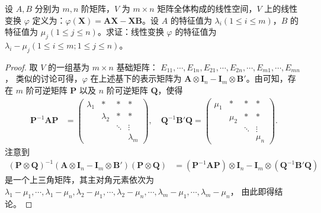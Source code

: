\documentclass[../../main.tex]{subfiles}%
\begin{document}
\begin{proposition}\label{proposition:线性变换AX-XB的表示矩阵和特征值}
设 $A,B$ 分别为 $m,n$ 阶矩阵，$V$ 为 $m \times n$ 矩阵全体构成的线性空间，$V$ 上的线性变换 $\varphi$ 定义为：$\varphi(\boldsymbol{X}) = \boldsymbol{AX} - \boldsymbol{XB}$。设 $A$ 的特征值为 $\lambda_i (1 \leqslant  i \leqslant  m)$，$B$ 的特征值为 $\mu_j (1 \leqslant  j \leqslant  n)$。求证：线性变换 $\varphi$ 的特征值为 $\lambda_i - \mu_j (1 \leqslant  i \leqslant  m; 1 \leqslant  j \leqslant  n)$。
\end{proposition}
\begin{proof}
取 $V$ 的一组基为 $m \times n$ 基础矩阵：
$E_{11},\cdots, E_{1n}, E_{21},\cdots, E_{2n},\cdots, E_{m1},\cdots, E_{mn}$，
类似的讨论可得，$\varphi$ 在上述基下的表示矩阵为 $\boldsymbol{A} \otimes \boldsymbol{I}_n - \boldsymbol{I}_m \otimes \boldsymbol{B}'$。由可知，存在 $m$ 阶可逆矩阵 $\boldsymbol{P}$ 以及 $n$ 阶可逆矩阵 $\boldsymbol{Q}$，使得
\begin{align*}
\boldsymbol{P}^{-1}\boldsymbol{AP} &= 
\begin{pmatrix}
\lambda_1 & * & * & * \\
 & \lambda_2 & * & * \\
 & & \ddots & \vdots \\
 & & & \lambda_m
\end{pmatrix}, \quad
\boldsymbol{Q}^{-1}\boldsymbol{B}'\boldsymbol{Q} = 
\begin{pmatrix}
\mu_1 & * & * & * \\
 & \mu_2 & * & * \\
 & & \ddots & \vdots \\
 & & & \mu_n
\end{pmatrix}.
\end{align*}
注意到
\begin{align*}
(\boldsymbol{P} \otimes \boldsymbol{Q})^{-1}(\boldsymbol{A} \otimes \boldsymbol{I}_n - \boldsymbol{I}_m \otimes \boldsymbol{B}')(\boldsymbol{P} \otimes \boldsymbol{Q}) 
&= (\boldsymbol{P}^{-1}\boldsymbol{AP}) \otimes \boldsymbol{I}_n - \boldsymbol{I}_m \otimes (\boldsymbol{Q}^{-1}\boldsymbol{B}'\boldsymbol{Q})
\end{align*}
是一个上三角矩阵，其主对角元素依次为
$\lambda_1 - \mu_1,\cdots, \lambda_1 - \mu_n, \lambda_2 - \mu_1,\cdots, \lambda_2 - \mu_n,\cdots, \lambda_m - \mu_1,\cdots, \lambda_m - \mu_n$，
由此即得结论。
\end{proof}
\end{document}
